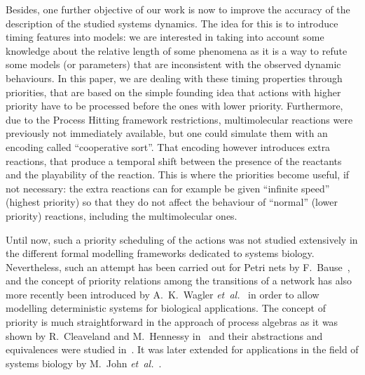 Besides, one further objective of our work is now %
to improve the accuracy of the description of the studied systems dynamics.
The idea for this is to introduce timing features into models:
we are interested in taking into account some knowledge about the relative length of some phenomena as it is a way to refute some models (or parameters) that are inconsistent with the observed dynamic behaviours.
In this paper, we are dealing with these timing properties through priorities,
that are based on the simple founding idea that actions with higher priority have to be processed before the ones with lower priority.
Furthermore, due to the Process Hitting framework restrictions, multimolecular reactions were previously not immediately available, but one could simulate them with an encoding called “cooperative sort”.
That encoding however introduces extra reactions,
that produce a temporal shift between the presence of the reactants
and the playability of the reaction.
This is where the priorities become useful, if not necessary:
the extra reactions can for example be given “infinite speed” (highest priority) so that they do not affect the behaviour of “normal” (lower priority) reactions, including the multimolecular ones.


Until now, such a priority scheduling of the actions was not studied extensively in the different formal modelling frameworks dedicated to systems biology.
Nevertheless, such an attempt has been carried out for Petri nets by F.~Bause~\cite{Bause97},
and the concept of priority relations among the transitions of a network has also more recently been introduced by A.~K.~Wagler \textit{et~al.}~\cite{waw,WaglerW12} in order to allow modelling deterministic systems for biological applications.
The concept of priority is much straightforward in the approach of process algebras as it was shown by R.~Cleaveland and M.~Hennessy in~\cite{Cleaveland199058,Cleaveland99prioritiesin} and their abstractions and equivalences were studied in~\cite{Cleaveland:2007:PAP:1282576.1282847}.
It was later extended for applications in the field of systems biology by M.~John \textit{et~al.}~\cite{jlnu2010}.

